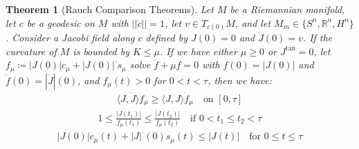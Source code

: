 \documentclass[11pt]{book}
\theoremstyle{break}
\theoremstyle{break}
\newtheorem{thm}{Theorem}[section]
\newcommand{\R}{\mathbb{R}}
\begin{document}
\begin{thm}[Rauch Comparison Theorems]
Let $M$ be a Riemannian manifold, let $c$ be a geodesic on $M$ with $||\dot{c}|| = 1$, let $v \in T_{c(0)}M$, and let $M_m \in \{S^n, \R^n, H^n\}$. Consider a Jacobi field along $c$ defined by $J(0) = 0$ and $\dot{J}(0) =v$. If the curvature of $M$ is bounded by $K \leq \mu$. If we have either $\mu \geq 0$ or $J^{\tan} = 0$, let $f_\mu \coloneqq |J(0)|c_{\mu} + |J(0)|^{\cdot}s_\mu$ solve $\ddot{f}+ \mu f = 0$ with $f(0) = |J(0)|$ and $\dot{f}(0) = |\dot{J}|(0)$, and $f_\mu(t) > 0$ for $0<t<\tau$, then we have:
\begin{align}
\langle J, \dot{J}\rangle f_\mu \geq \langle J , J \rangle \dot{f}_\mu \quad\text{on }[0,\tau]
\end{align}
\begin{align}
1\leq \frac{|J(t_1)|}{f_\mu (t_1)} \leq \frac{|J(t_2)|}{f_\mu (t_2)} \quad \text{if }0 < t_1 \leq t_2 < \tau
\end{align}
\begin{align}
|J(0)| c_\mu(t) + |J|^{\cdot}(0) s_\mu(t) \leq |J(t)| \quad \text{for }0\leq t\leq \tau
\end{align}
\end{thm}
\end{document}

